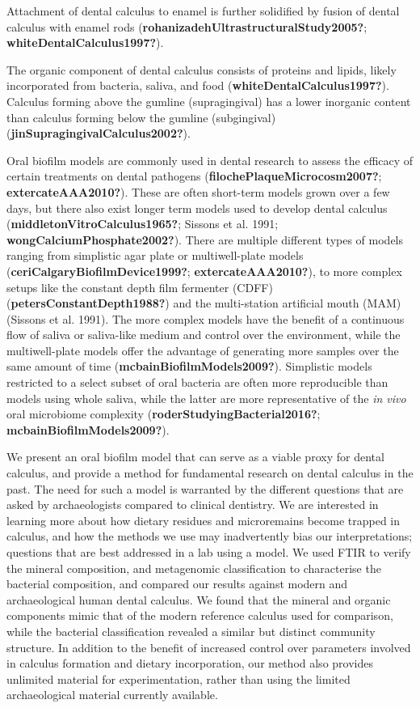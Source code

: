 \documentclass[
]{article}
\begin{document}
Attachment of dental calculus to enamel is further solidified by fusion
of dental calculus with enamel rods
(\textbf{rohanizadehUltrastructuralStudy2005?};
\textbf{whiteDentalCalculus1997?}).

The organic component of dental calculus consists of proteins and
lipids, likely incorporated from bacteria, saliva, and food
(\textbf{whiteDentalCalculus1997?}). Calculus forming above the gumline
(supragingival) has a lower inorganic content than calculus forming
below the gumline (subgingival)
(\textbf{jinSupragingivalCalculus2002?}).

Oral biofilm models are commonly used in dental research to assess the
efficacy of certain treatments on dental pathogens
(\textbf{filochePlaqueMicrocosm2007?}; \textbf{extercateAAA2010?}).
These are often short-term models grown over a few days, but there also
exist longer term models used to develop dental calculus
(\textbf{middletonVitroCalculus1965?}; Sissons et al. 1991;
\textbf{wongCalciumPhosphate2002?}). There are multiple different types
of models ranging from simplistic agar plate or multiwell-plate models
(\textbf{ceriCalgaryBiofilmDevice1999?}; \textbf{extercateAAA2010?}), to
more complex setups like the constant depth film fermenter (CDFF)
(\textbf{petersConstantDepth1988?}) and the multi-station artificial
mouth (MAM) (Sissons et al. 1991). The more complex models have the
benefit of a continuous flow of saliva or saliva-like medium and control
over the environment, while the multiwell-plate models offer the
advantage of generating more samples over the same amount of time
(\textbf{mcbainBiofilmModels2009?}). Simplistic models restricted to a
select subset of oral bacteria are often more reproducible than models
using whole saliva, while the latter are more representative of the
\emph{in vivo} oral microbiome complexity
(\textbf{roderStudyingBacterial2016?};
\textbf{mcbainBiofilmModels2009?}).

We present an oral biofilm model that can serve as a viable proxy for
dental calculus, and provide a method for fundamental research on dental
calculus in the past. The need for such a model is warranted by the
different questions that are asked by archaeologists compared to
clinical dentistry. We are interested in learning more about how dietary
residues and microremains become trapped in calculus, and how the
methods we use may inadvertently bias our interpretations; questions
that are best addressed in a lab using a model. We used FTIR to verify
the mineral composition, and metagenomic classification to characterise
the bacterial composition, and compared our results against modern and
archaeological human dental calculus. We found that the mineral and
organic components mimic that of the modern reference calculus used for
comparison, while the bacterial classification revealed a similar but
distinct community structure. In addition to the benefit of increased
control over parameters involved in calculus formation and dietary
incorporation, our method also provides unlimited material for
experimentation, rather than using the limited archaeological material
currently available.
\end{document}
